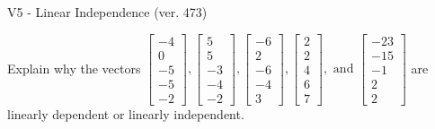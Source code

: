 \begin{exercise}
  \begin{exerciseTitle}V5 - Linear Independence (ver. 473)\end{exerciseTitle}
  \begin{exerciseStatement}
    Explain why the vectors \(\left[\begin{array}{r}
-4 \\
0 \\
-5 \\
-5 \\
-2
\end{array}\right] , \left[\begin{array}{r}
5 \\
5 \\
-3 \\
-4 \\
-2
\end{array}\right] , \left[\begin{array}{r}
-6 \\
2 \\
-6 \\
-4 \\
3
\end{array}\right] , \left[\begin{array}{r}
2 \\
2 \\
4 \\
6 \\
7
\end{array}\right] , \text{ and } \left[\begin{array}{r}
-23 \\
-15 \\
-1 \\
2 \\
2
\end{array}\right]\) are linearly dependent or linearly independent.	



\end{exerciseStatement}
\end{exercise}
